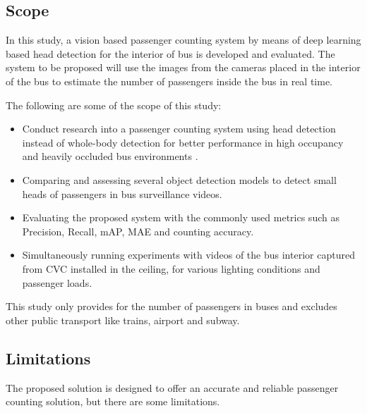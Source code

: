 \subsection{Scope}

In this study, a vision based passenger counting system by means of deep learning based head detection for the interior of bus is developed and evaluated. The system to be proposed will use the images from the cameras placed in the interior of the bus to estimate the number of passengers inside the bus in real time.

The following are some of the scope of this study:

\begin{itemize}[itemsep=0pt]

    \item Conduct research into a passenger counting system using head detection instead of whole-body detection for better performance in high occupancy and heavily occluded bus environments \cite{rpeeheads2024}.
    
    \item Comparing and assessing several object detection models to detect small heads of passengers in bus surveillance videos.
    
    \item Evaluating the proposed system with the commonly used metrics such as Precision, Recall, mAP, MAE and counting accuracy.
    
    \item Simultaneously running experiments with videos of the bus interior captured from CVC installed in the ceiling, for various lighting conditions and passenger loads.

\end{itemize}

This study only provides for the number of passengers in buses and excludes other public transport like trains, airport and subway.

\subsection{Limitations}

The proposed solution is designed to offer an accurate and reliable passenger counting solution, but there are some limitations.

